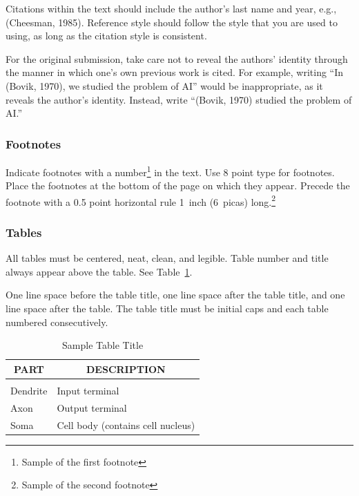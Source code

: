 \documentclass[letterpaper]{article}
\begin{document}
Citations within the text should include the author's last name and
year, e.g., (Cheesman, 1985). Reference style should follow the style
that you are used to using, as long as the citation style is
consistent.

For the original submission, take care not to reveal the authors' identity through
the manner in which one's own previous work is cited.  For example, writing
``In (Bovik, 1970), we studied the problem of AI'' would be inappropriate, as
it reveals the author's identity.  Instead, write ``(Bovik, 1970) studied the
problem of AI.''

\subsubsection{Footnotes}

Indicate footnotes with a number\footnote{Sample of the first
footnote} in the text. Use 8 point type for footnotes.  Place the
footnotes at the bottom of the page on which they appear.  Precede the
footnote with a 0.5 point horizontal rule 1~inch (6~picas)
long.\footnote{Sample of the second footnote}



\subsubsection{Tables}

All tables must be centered, neat, clean, and legible. Table number
and title always appear above the table.  See
Table~\ref{sample-table}.

One line space before the table title, one line space after the table
title, and one line space after the table. The table title must be
initial caps and each table numbered consecutively.

\begin{table}[h]
\caption{Sample Table Title}
\label{sample-table}
\begin{center}
\begin{tabular}{ll}
\multicolumn{1}{c}{\bf PART}  &\multicolumn{1}{c}{\bf DESCRIPTION} \\
\hline \\
Dendrite         &Input terminal \\
Axon             &Output terminal \\
Soma             &Cell body (contains cell nucleus) \\
\end{tabular}
\end{center}
\end{table}
\end{document}
